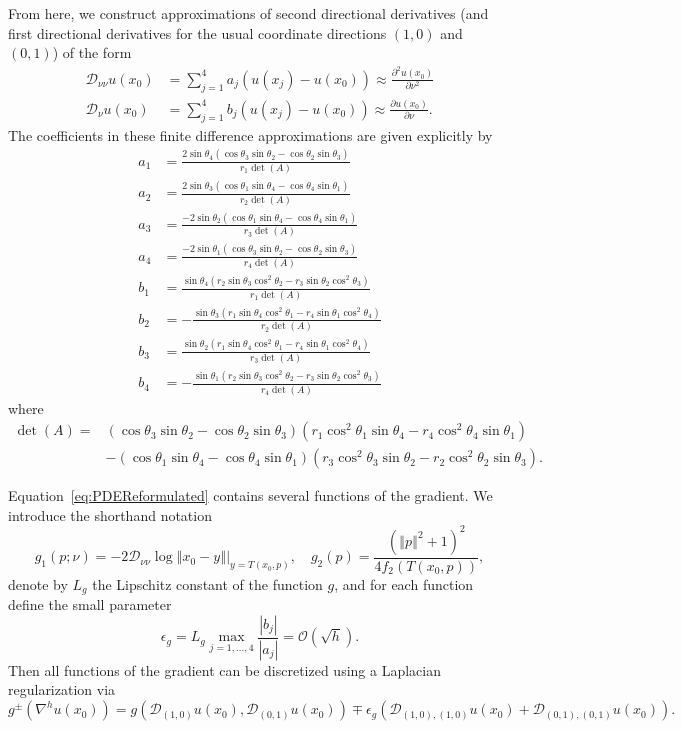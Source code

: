 \documentclass{amsart}
\newcommand{\bq}{\begin{equation}}
\newcommand{\eq}{\end{equation}}
\newcommand{\abs}[1]{\left\vert#1\right\vert}
\newcommand{\norm}[1]{\left\Vert#1\right\Vert}
\newcommand{\bO}{\mathcal{O}}
\newcommand{\Dt}{\mathcal{D}}
\theoremstyle{lemma}
\theoremstyle{remark}
\begin{document}
From here, we construct approximations of second directional derivatives (and first directional derivatives for the usual coordinate directions $(1,0)$ and $(0,1)$) of the form
\bq\label{eq:dnu}
\begin{split}
\Dt_{\nu\nu}u(x_0) &= \sum\limits_{j=1}^4 a_j(u(x_j)-u(x_0)) \approx \frac{\partial^2u(x_0)}{\partial\nu^2}\\
\Dt_{\nu}u(x_0) &= \sum\limits_{j=1}^4 b_j(u(x_j)-u(x_0)) \approx \frac{\partial u(x_0)}{\partial\nu}.
\end{split}
\eq
The coefficients in these finite difference approximations are given explicitly by
\bq\label{eq:coeffs}
\begin{split}
a_{1} &= \frac{2\sin\theta_4(\cos\theta_3\sin\theta_2-\cos\theta_2\sin\theta_3)}{r_1\det(A)}\\
a_{2} &= \frac{2\sin\theta_3(\cos\theta_1\sin\theta_4-\cos\theta_4\sin\theta_1)}{r_2\det(A)}\\
a_{3} &= \frac{-2\sin\theta_2(\cos\theta_1\sin\theta_4-\cos\theta_4\sin\theta_1)}{r_3\det(A)}\\
a_{4} &= \frac{-2\sin\theta_1(\cos\theta_3\sin\theta_2-\cos\theta_2\sin\theta_3)}{r_4\det(A)}\\
b_{1} &= \frac{\sin\theta_4 (r_2\sin\theta_3 \cos^2\theta_2 - r_3\sin\theta_2 \cos^2\theta_3)}{r_1\det(A)} \\
b_{2} &= -\frac{\sin\theta_3 (r_1\sin\theta_4 \cos^2\theta_1 - r_4\sin\theta_1 \cos^2\theta_4)}{r_2\det(A)} \\
b_{3} &= \frac{\sin\theta_2 (r_1\sin\theta_4 \cos^2\theta_1 - r_4\sin\theta_1 \cos^2\theta_4)}{r_3\det(A)} \\
b_{4} &= -\frac{\sin\theta_1 (r_2\sin\theta_3 \cos^2\theta_2 - r_3\sin\theta_2 \cos^2\theta_3)}{r_4\det(A)}
\end{split}
\eq
where 
\bq\label{eq:detA}\begin{split}\det(A) = &(\cos\theta_3\sin\theta_2-\cos\theta_2\sin\theta_3)(r_1\cos^2\theta_1\sin\theta_4-r_4\cos^2\theta_4\sin\theta_1)\\&-(\cos\theta_1\sin\theta_4-\cos\theta_4\sin\theta_1)(r_3\cos^2\theta_3\sin\theta_2-r_2\cos^2\theta_2\sin\theta_3).\end{split}\eq

Equation~\eqref{eq:PDEReformulated} contains several functions of the gradient.  We introduce the shorthand notation
\bq\label{eq:gradFuns}
g_1(p;\nu) = \left. -2\Dt_{\nu\nu}\log\norm{x_0-y}\right|_{y=T(x_0,p)}, \quad g_2(p) = \frac{\left(\norm{p}^2+1\right)^2}{4f_2(T(x_0,p))},
\eq
denote by $L_g$ the Lipschitz constant of the function $g$, and for each function define the small parameter
\bq\label{eq:epsilon}
\epsilon_g = L_g\max\limits_{j=1,\ldots,4}\frac{\abs{b_j}}{\abs{a_j}} = \bO(\sqrt{h}).
\eq
Then all functions of the gradient can be discretized using a Laplacian regularization via
\bq\label{eq:discGrad}
g^{\pm}\left(\nabla^h u(x_0)\right) = g\left(\Dt_{(1,0)}u(x_0),\Dt_{(0,1)}u(x_0)\right) \mp \epsilon_g\left(\Dt_{(1,0),(1,0)}u(x_0) + \Dt_{(0,1),(0,1)}u(x_0)\right).
\eq
\end{document}

